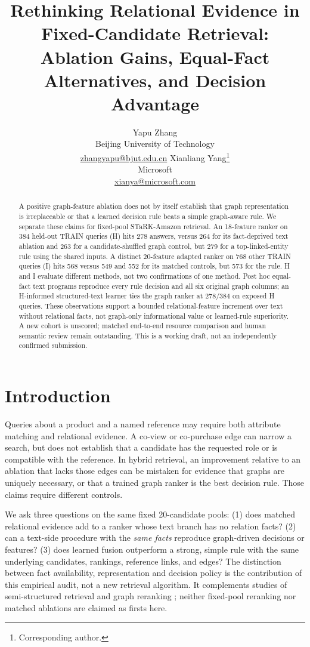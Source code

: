 \documentclass{article}
\title{Rethinking Relational Evidence in Fixed-Candidate Retrieval:\\
Ablation Gains, Equal-Fact Alternatives, and Decision Advantage}
\author{Yapu Zhang \\
Beijing University of Technology \\
\href{mailto:zhangyapu@bjut.edu.cn}{zhangyapu@bjut.edu.cn}
\And
Xianliang Yang\thanks{Corresponding author.} \\
Microsoft \\
\href{mailto:xianya@microsoft.com}{xianya@microsoft.com}}
\begin{document}
\maketitle
\begin{abstract}
A positive graph-feature ablation does not by itself establish that graph
representation is irreplaceable or that a learned decision rule beats a simple
graph-aware rule. We separate these claims for fixed-pool STaRK-Amazon retrieval.
An 18-feature ranker on 384 held-out TRAIN queries (H) hits 278 answers, versus
264 for its fact-deprived text ablation and 263 for a candidate-shuffled graph
control, but 279 for a top-linked-entity rule using the shared inputs. A distinct
20-feature adapted ranker on 768 other TRAIN queries (I) hits 568 versus 549 and
552 for its matched controls, but 573 for the rule. H and I evaluate different
methods, not two confirmations of one method. Post hoc equal-fact text programs
reproduce every rule decision and all six original graph columns; an H-informed
structured-text learner ties the graph ranker at 278/384 on exposed H queries.
These observations support a bounded relational-feature increment over text
without relational facts, not graph-only informational value or learned-rule
superiority. A new cohort is unscored; matched end-to-end resource comparison
and human semantic review remain outstanding. This is a working draft, not an
independently confirmed submission.
\end{abstract}

\section{Introduction}
Queries about a product and a named reference may require both attribute
matching and relational evidence. A co-view or co-purchase edge can narrow a
search, but does not establish that a candidate has the requested role or is
compatible with the reference. In hybrid retrieval, an improvement relative to
an ablation that lacks those edges can be mistaken for evidence that graphs are
uniquely necessary, or that a trained graph ranker is the best decision rule.
Those claims require different controls.

We ask three questions on the same fixed 20-candidate pools: (1) does matched
relational evidence add to a ranker whose text branch has no relation facts?
(2) can a text-side procedure with the \emph{same facts} reproduce graph-driven
decisions or features? (3) does learned fusion outperform a strong, simple
rule with the same underlying candidates, rankings, reference links, and edges?
The distinction between fact availability, representation and decision policy
is the contribution of this empirical audit, not a new retrieval algorithm.
It complements studies of semi-structured retrieval \citep{stark,hybgrag,autofocus,grasp}
and graph reranking \citep{grag,subgraphrag}; neither fixed-pool reranking nor
matched ablations are claimed as firsts here.
\end{document}
